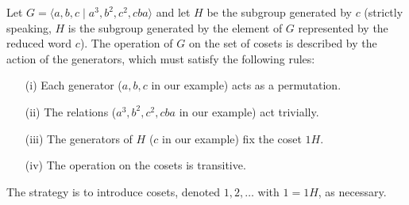 \documentclass[a4paper,11pt,final]{memoir}%
\theoremstyle{nonumberplain}
\begin{document}
Let $G=\langle a,b,c\mid a^{3},b^{2},c^{2},cba\rangle$ and let $H$ be the
subgroup generated by $c$ (strictly speaking, $H$ is the subgroup generated by
the element of $G$ represented by the reduced word $c$). The operation of $G$
on the set of cosets is described by the action of the generators, which must
satisfy the following rules:

\begin{enumerate}
\item[(i)] Each generator ($a,b,c$ in our example) acts as a permutation.

\item[(ii)] The relations ($a^{3},b^{2},c^{2},cba$ in our example) act trivially.

\item[(iii)] The generators of $H$ ($c$ in our example) fix the coset $1H$.

\item[(iv)] The operation on the cosets is transitive.
\end{enumerate}

The strategy is to introduce cosets, denoted $1,2,\ldots$ with $1 =1H$, as necessary.
\end{document}
